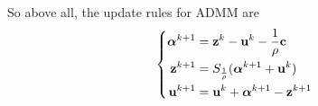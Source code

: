 So above all, the update rules for ADMM are
$$\left\{
\begin{aligned}
\boldsymbol{\alpha}^{k+1} & = \mathbf{z}^k - \mathbf{u}^k - \dfrac{1}{\rho}\mathbf{c} \\
\mathbf{z}^{k+1} & = S_{\frac{1}{\rho}}(\boldsymbol{\alpha}^{k+1} + \mathbf{u}^k) \\
\mathbf{u}^{k+1} & = \mathbf{u}^k + \boldsymbol{\alpha}^{k+1} - \mathbf{z}^{k+1}
\end{aligned}
\right.$$

\newpage
